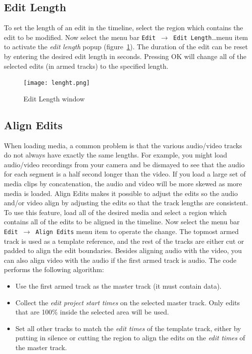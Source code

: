 \subsection{Edit Length}%
\label{sub:edit-lenght}

To set the length of an edit in the timeline, select the region
which contains the edit to be modified. Now select the menu bar
\texttt{Edit $\rightarrow$ Edit Length}\dots menu item to activate
the \textit{edit length} popup (figure~\ref{fig:lenght}).  The
duration of the edit can be reset by entering the desired edit
length in seconds.  Pressing OK will change all of the selected
edits (in armed tracks) to the specified length.

\begin{figure}[htpb]
    \centering
    \texttt{[image: lenght.png]}
    \caption{Edit Length window}
    \label{fig:lenght}
\end{figure}

\subsection{Align Edits}%
\label{sub:align_edits}

When loading media, a common problem is that the various audio/video
tracks do not always have exactly the same lengths. For example, you
might load audio/video recordings from your camera and be dismayed
to see that the audio for each segment is a half second longer than
the video. If you load a large set of media clips by concatenation,
the audio and video will be more skewed as more media is
loaded. Align Edits makes it possible to adjust the edits so the
audio and/or video align by adjusting
the edits so that the track lengths are consistent. To use this
feature, load all of the desired media and select a region which
contains all of the edits to be aligned in the timeline. Now select
the menu bar \texttt{Edit $\rightarrow$ Align Edits} menu item to
operate the change. The topmost armed track is used as a template
reference, and the rest of the tracks are either cut or padded to
align the edit boundaries.  Besides aligning audio with the video,
you can also align video with the audio if the first armed track is
audio. The code performs the following algorithm:

\begin{itemize}
\item Use the first armed track as the master track (it must
  contain data).
\item Collect the \textit{edit project start times} on the
  selected master track. Only edits that are 100\% inside the selected
  area will be used.
\item Set all other tracks to match the \textit{edit times} of
  the template track, either by putting in silence or cutting the
  region to align the edits on the \textit{edit times} of the master
  track.
\end{itemize}

